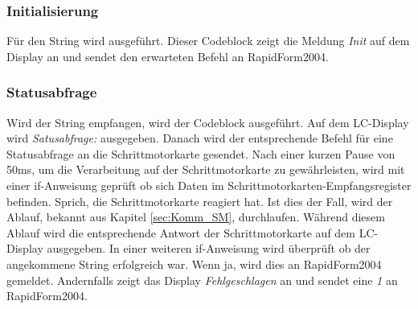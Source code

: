 \subsubsection{Initialisierung}
Für den String  wird  ausgeführt. Dieser Codeblock zeigt die Meldung \emph{Init} auf dem Display an und sendet den erwarteten Befehl an RapidForm2004.
\lstset{language=C, basicstyle=\footnotesize, showstringspaces=false, tabsize=8}


\subsubsection{Statusabfrage}
Wird der String  empfangen, wird der Codeblock  ausgeführt. Auf dem LC-Display wird \emph{Satusabfrage:} ausgegeben. Danach wird der entsprechende Befehl für eine Statusabfrage an die Schrittmotorkarte gesendet. Nach einer kurzen Pause von 50ms, um die Verarbeitung auf der Schrittmotorkarte zu gewährleisten, wird mit einer if-Anweisung geprüft ob sich Daten im Schrittmotorkarten-Empfangsregister befinden. Sprich, die Schrittmotorkarte reagiert hat. Ist dies der Fall, wird der Ablauf, bekannt aus Kapitel \ref{sec:Komm_SM}, durchlaufen. Während diesem Ablauf wird die entsprechende Antwort der Schrittmotorkarte auf dem LC-Display ausgegeben. In einer weiteren if-Anweisung wird überprüft ob der angekommene String erfolgreich war. Wenn ja, wird dies an RapidForm2004 gemeldet. Andernfalls zeigt das Display \emph{Fehlgeschlagen} an und sendet eine \emph{1} an RapidForm2004.
\lstset{language=C, basicstyle=\footnotesize, showstringspaces=false, tabsize=8}



